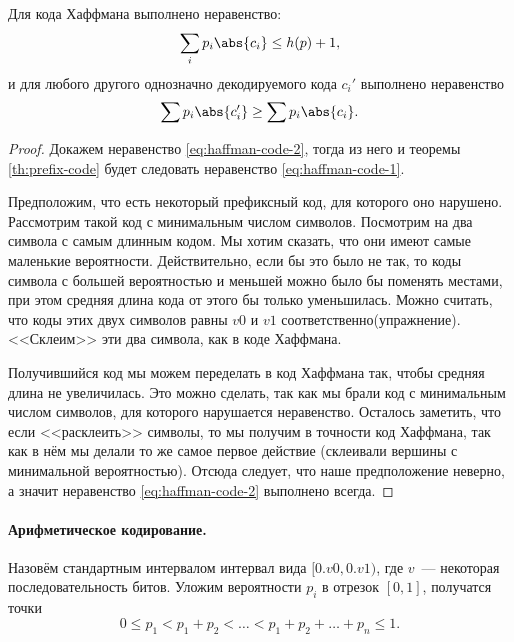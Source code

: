 \begin{theorem}[Хаффман]
    Для кода Хаффмана выполнено неравенство:
    \begin{equation}
        \label{eq:haffman-code-1}
        \sum_i p_i \abs{c_i} \le h(p) + 1,
    \end{equation}
    и для любого другого однозначно декодируемого кода $c_i'$ выполнено неравенство
    \begin{equation}
        \label{eq:haffman-code-2}
        \sum p_i\abs{c_i'} \ge \sum p_i\abs{c_i}.
    \end{equation}
\end{theorem}

\begin{proof}
    Докажем неравенство \eqref{eq:haffman-code-2}, тогда из него и теоремы \ref{th:prefix-code} будет
    следовать неравенство \eqref{eq:haffman-code-1}.

    Предположим, что есть некоторый префиксный код, для которого оно нарушено. Рассмотрим такой код с
    минимальным числом символов. Посмотрим на два символа с самым длинным кодом. Мы хотим сказать, что
    они имеют самые маленькие вероятности. Действительно, если бы это было не так, то коды символа с
    большей вероятностью и меньшей можно было бы поменять местами, при этом средняя длина кода от этого
    бы только уменьшилась. Можно считать, что коды этих двух символов равны $v0$ и $v1$
    соответственно(упражнение). <<Склеим>> эти два символа, как в коде Хаффмана.

    Получившийся код мы можем переделать в код Хаффмана так, чтобы средняя длина не увеличилась. Это
    можно сделать, так как мы брали код с минимальным числом символов, для которого нарушается
    неравенство. Осталось заметить, что если <<расклеить>> символы, то мы получим в точности 
    код Хаффмана, так как в нём мы делали то же самое первое действие (склеивали вершины с минимальной
    вероятностью). Отсюда следует, что наше предположение неверно, а значит неравенство
    \eqref{eq:haffman-code-2} выполнено всегда.
\end{proof}

\paragraph{Арифметическое кодирование.}
Назовём стандартным интервалом интервал вида $[0.v0, 0.v1)$, где $v$~--- некоторая последовательность
битов. Уложим вероятности $p_i$ в отрезок $[0, 1]$, получатся точки
$$
0 \le p_1 <  p_1 + p_2 < \dots < p_1 + p_2 + \dots + p_n \le 1.
$$ 

